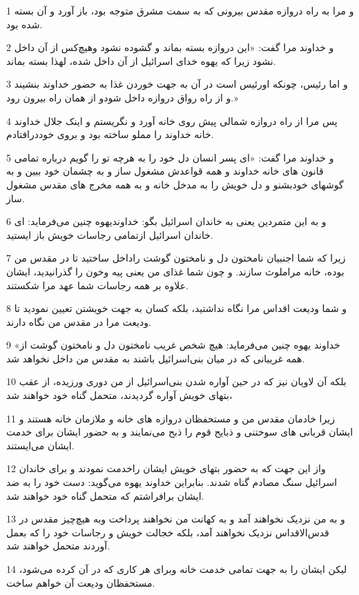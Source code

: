 \par 1 و مرا به راه دروازه مقدس بیرونی که به سمت مشرق متوجه بود، باز آورد و آن بسته شده بود.
\par 2 و خداوند مرا گفت: «این دروازه بسته بماند و گشوده نشود وهیچ‌کس از آن داخل نشود زیرا که یهوه خدای اسرائیل از آن داخل شده، لهذا بسته بماند.
\par 3 و اما رئیس، چونکه اورئیس است در آن به جهت خوردن غذا به حضور خداوند بنشیند و از راه رواق دروازه داخل شودو از همان راه بیرون رود.»
\par 4 پس مرا از راه دروازه شمالی پیش روی خانه آورد و نگریستم و اینک جلال خداوند خانه خداوند را مملو ساخته بود و بروی خوددرافتادم.
\par 5 و خداوند مرا گفت: «ای پسر انسان دل خود را به هرچه تو را گویم درباره تمامی قانون های خانه خداوند و همه قواعدش مشغول ساز و به چشمان خود ببین و به گوشهای خودبشنو و دل خویش را به مدخل خانه و به همه مخرج های مقدس مشغول ساز.
\par 6 و به این متمردین یعنی به خاندان اسرائیل بگو: خداوندیهوه چنین می‌فرماید: ای خاندان اسرائیل ازتمامی رجاسات خویش باز ایستید.
\par 7 زیرا که شما اجنبیان نامختون دل و نامختون گوشت راداخل ساختید تا در مقدس من بوده، خانه مراملوث سازند. و چون شما غذای من یعنی پیه وخون را گذرانیدید، ایشان علاوه بر همه رجاسات شما عهد مرا شکستند.
\par 8 و شما ودیعت اقداس مرا نگاه نداشتید، بلکه کسان به جهت خویشتن تعیین نمودید تا ودیعت مرا در مقدس من نگاه دارند.
\par 9 «خداوند یهوه چنین می‌فرماید: هیچ شخص غریب نامختون دل و نامختون گوشت از همه غریبانی که در میان بنی‌اسرائیل باشند به مقدس من داخل نخواهد شد.
\par 10 بلکه آن لاویان نیز که در حین آواره شدن بنی‌اسرائیل از من دوری ورزیده، از عقب بتهای خویش آواره گردیدند، متحمل گناه خود خواهند شد،
\par 11 زیرا خادمان مقدس من و مستحفظان دروازه های خانه و ملازمان خانه هستند و ایشان قربانی های سوختنی و ذبایح قوم را ذبح می‌نمایند و به حضور ایشان برای خدمت ایشان می‌ایستند.
\par 12 واز این جهت که به حضور بتهای خویش ایشان راخدمت نمودند و برای خاندان اسرائیل سنگ مصادم گناه شدند. بنابراین خداوند یهوه می‌گوید: دست خود را به ضد ایشان برافراشتم که متحمل گناه خود خواهند شد.
\par 13 و به من نزدیک نخواهند آمد و به کهانت من نخواهند پرداخت وبه هیچ‌چیز مقدس در قدس‌الاقداس نزدیک نخواهند آمد، بلکه خجالت خویش و رجاسات خود را که بعمل آوردند متحمل خواهند شد.
\par 14 لیکن ایشان را به جهت تمامی خدمت خانه وبرای هر کاری که در آن کرده می‌شود، مستحفظان ودیعت آن خواهم ساخت.
